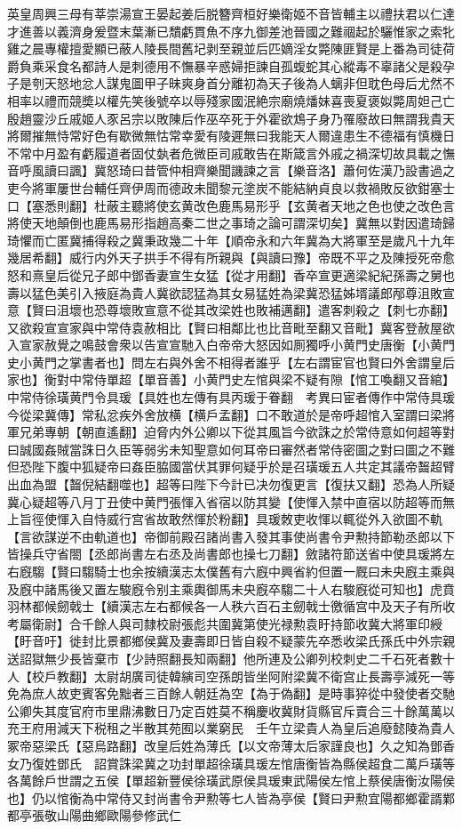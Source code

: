 英皇周興三母有莘崇湯宣王晏起姜后脱簪齊桓好樂衛姬不音皆輔主以禮扶君以仁達才進善以義濟身爰暨末葉漸已穨虧貫魚不序九御差池晉國之難祻起於驪惟家之索牝雞之晨專權擅愛顯已蔽人陵長間舊圮剥至親並后匹嫡淫女斃陳匪賢是上番為司徒荷爵負乘采食名都詩人是刺德用不憮暴辛惑婦拒諫自孤蝮蛇其心縱毒不辜諸父是殺孕子是刳天怒地忿人謀鬼圖甲子昧爽身首分離初為天子後為人螭非但耽色母后尤然不相率以禮而競奬以權先笑後號卒以辱殘家國泯絶宗廟燒燔妹喜喪夏褒姒斃周妲己亡殷趙靈沙丘戚姬人豕呂宗以敗陳后作巫卒死于外霍欲鴆子身乃罹廢故曰無謂我貴天將爾摧無恃常好色有歇微無怙常幸愛有陵遲無曰我能天人爾違患生不德福有慎機日不常中月盈有虧履道者固仗埶者危微臣司戚敢告在斯箴言外戚之禍深切故具載之憮音呼風讀曰諷】冀怒琦曰昔管仲相齊樂聞譏諫之言【樂音洛】蕭何佐漢乃設書過之吏今將軍屢世台輔任齊伊周而德政未聞黎元塗炭不能結納貞良以救禍敗反欲鉗塞士口【塞悉則翻】杜蔽主聽將使玄黄改色鹿馬易形乎【玄黄者天地之色也使之改色言將使天地顛倒也鹿馬易形指趙高秦二世之事琦之論可謂深切矣】冀無以對因遣琦歸琦懼而亡匿冀捕得殺之冀秉政幾二十年【順帝永和六年冀為大將軍至是歲凡十九年幾居希翻】威行内外天子拱手不得有所親與【與讀曰豫】帝既不平之及陳授死帝愈怒和熹皇后從兄子郎中鄧香妻宣生女猛【從才用翻】香卒宣更適梁紀紀孫壽之舅也壽以猛色美引入掖庭為貴人冀欲認猛為其女易猛姓為梁冀恐猛姊壻議郎邴尊沮敗宣意【賢曰沮壞也恐尊壞敗宣意不從其改梁姓也敗補邁翻】遣客刺殺之【刺七亦翻】又欲殺宣宣家與中常侍袁赦相比【賢曰相鄰比也比音毗至翻又音毗】冀客登赦屋欲入宣家赦覺之鳴鼓會衆以告宣宣馳入白帝帝大怒因如厠獨呼小黄門史唐衡【小黄門史小黄門之掌書者也】問左右與外舍不相得者誰乎【左右謂宦官也賢曰外舍謂皇后家也】衡對中常侍單超【單音善】小黄門史左悺與梁不疑有隙【悺工喚翻又音綰】中常侍徐璜黄門令具瑗【具姓也左傳有具丙瑗于眷翻　考異曰宦者傳作中常侍具瑗今從梁冀傳】常私忿疾外舍放横【横戶孟翻】口不敢道於是帝呼超悺入室謂曰梁將軍兄弟專朝【朝直遙翻】迫脅内外公卿以下從其風旨今欲誅之於常侍意如何超等對曰誠國姦賊當誅日久臣等弱劣未知聖意如何耳帝曰審然者常侍密圖之對曰圖之不難但恐陛下腹中狐疑帝曰姦臣脇國當伏其罪何疑乎於是召璜瑗五人共定其議帝齧超臂出血為盟【齧倪結翻噬也】超等曰陛下今計已决勿復更言【復扶又翻】恐為人所疑冀心疑超等八月丁丑使中黄門張惲入省宿以防其變【使惲入禁中直宿以防超等而無上旨徑使惲入自恃威行宫省故敢然惲於粉翻】具瑗敇吏收惲以輒從外入欲圖不軌【言欲謀逆不由軌道也】帝御前殿召諸尚書入發其事使尚書令尹勲持節勒丞郎以下皆操兵守省閤【丞郎尚書左右丞及尚書郎也操七刀翻】斂諸符節送省中使具瑗將左右廐騶【賢曰騶騎士也余按續漢志太僕舊有六廐中興省約但置一厩曰未央廐主乘與及廐中諸馬後又置左駿廐令别主乘輿御馬未央廐卒騶二十人右駿廐從可知也】虎賁羽林都候劒戟士【續漢志左右都候各一人秩六百石主劒戟士徼循宫中及天子有所收考屬衛尉】合千餘人與司隸校尉張彪共圍冀第使光禄勲袁盱持節收冀大將軍印綬【盱音吁】徙封比景都鄉侯冀及妻壽即日皆自殺不疑蒙先卒悉收梁氏孫氏中外宗親送詔獄無少長皆棄市【少詩照翻長知兩翻】他所連及公卿列校刺史二千石死者數十人【校戶教翻】太尉胡廣司徒韓縯司空孫朗皆坐阿附梁冀不衛宫止長壽亭減死一等免為庶人故吏賓客免黜者三百餘人朝廷為空【為于偽翻】是時事猝從中發使者交馳公卿失其度官府市里鼎沸數日乃定百姓莫不稱慶收冀財貨縣官斥賣合三十餘萬萬以充王府用減天下税租之半散其苑囿以業窮民　壬午立梁貴人為皇后追廢懿陵為貴人冢帝惡梁氏【惡烏路翻】改皇后姓為薄氏【以文帝薄太后家謹良也】久之知為鄧香女乃復姓鄧氏　詔賞誅梁冀之功封單超徐璜具瑗左悺唐衡皆為縣侯超食二萬戶璜等各萬餘戶世謂之五侯【單超新豐侯徐璜武原侯具瑗東武陽侯左悺上蔡侯唐衡汝陽侯也】仍以悺衡為中常侍又封尚書令尹勲等七人皆為亭侯【賢曰尹勲宜陽都鄉霍諝鄴都亭張敬山陽曲鄉歐陽參修武仁